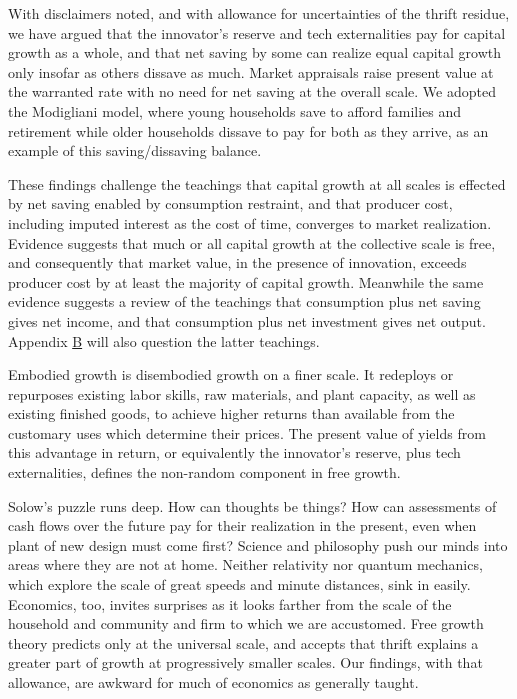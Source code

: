 \documentclass[a4padisinvitingper,fleqn]{latex_styles/cas-sc}
\begin{document}
With disclaimers noted, and with allowance for uncertainties of the thrift residue, we have argued that the innovator's reserve and tech externalities pay for capital growth as a whole, and that net saving by some can realize equal capital growth only insofar as others dissave as much. Market appraisals raise present value at the warranted rate with no need for net saving at the overall scale. We adopted the Modigliani model, where young households save to afford families and retirement while older households dissave to pay for both as they arrive, as an example of this saving/dissaving balance.

These findings challenge the teachings that capital growth at all scales is effected
by net saving enabled by consumption restraint, and that producer
cost, including imputed interest as the cost of time,
converges to market realization. Evidence suggests that much or all capital growth at the collective scale is free, and
consequently that market value, in the presence of innovation,
exceeds producer cost by at least the majority of capital growth. Meanwhile the same evidence suggests a review of the teachings that consumption plus net saving gives net income, and that consumption plus net investment gives net output. Appendix \hyperref[appendix-b]{B} will also question the latter teachings.

Embodied growth is disembodied growth on a finer scale. It redeploys or
repurposes existing labor skills, raw materials, and plant capacity, as
well as existing finished goods, to achieve higher returns than
available from the customary uses which determine their prices. The
present value of yields from this advantage in return, or equivalently
the innovator's reserve, plus tech externalities, defines the non-random component in free growth.

Solow's puzzle runs deep. How can thoughts be things? How can assessments of 
cash flows over the future pay for their realization in the present, even when plant of new design must come first?
Science and philosophy push our minds into areas where they are not at home. Neither relativity nor quantum mechanics, which explore the scale of great speeds and minute distances, sink in easily. Economics, too, invites surprises as it looks farther from the scale of the household and community and firm to which we are accustomed. Free growth theory predicts only at the universal scale, and accepts that thrift explains a greater part of growth at progressively smaller scales. Our findings, with that allowance, are awkward for much of economics as generally taught. 
\end{document}
